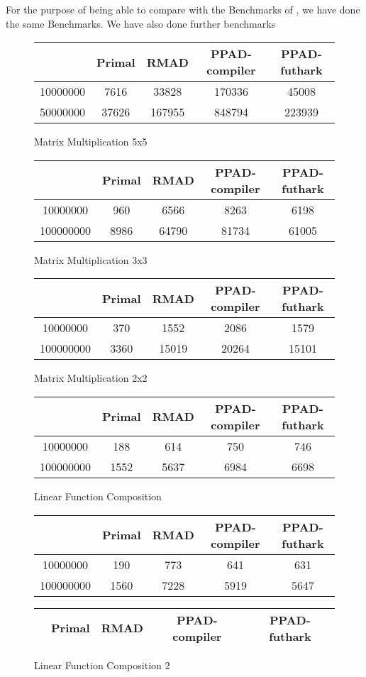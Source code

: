 \documentclass{article}
\begin{document}
For the purpose of being able to compare with the Benchmarks of
\cite{Futhark}, we have done the same Benchmarks. We have also done further
benchmarks
\begin{figure}
	\begin{tabular}{|c|c|c|c|c|}
		         & Primal & RMAD   & PPAD-compiler & PPAD-futhark \\
		\hline
		10000000 & 7616   & 33828  & 170336        & 45008        \\
		50000000 & 37626  & 167955 & 848794        & 223939
	\end{tabular}
	\caption{Matrix Multiplication 5x5}
	\begin{tabular}{|c|c|c|c|c|}
		          & Primal & RMAD  & PPAD-compiler & PPAD-futhark \\
		\hline

		10000000  & 960    & 6566  & 8263          & 6198         \\
		100000000 & 8986   & 64790 & 81734         & 61005
	\end{tabular}
	\caption{Matrix Multiplication 3x3}
	\begin{tabular}{|c|c|c|c|c|}
		          & Primal & RMAD  & PPAD-compiler & PPAD-futhark \\
		\hline

		10000000  & 370    & 1552  & 2086          & 1579         \\
		100000000 & 3360   & 15019 & 20264         & 15101
	\end{tabular}
	\caption{Matrix Multiplication 2x2}
	\begin{tabular}{|c|c|c|c|c|}
		          & Primal & RMAD & PPAD-compiler & PPAD-futhark \\
		\hline

		10000000  & 188    & 614  & 750           & 746          \\
		100000000 & 1552   & 5637 & 6984          & 6698
	\end{tabular}
	\caption{Linear Function Composition}
	\begin{tabular}{|c|c|c|c|c|}
		          & Primal & RMAD & PPAD-compiler & PPAD-futhark \\
		\hline

		10000000  & 190    & 773  & 641           & 631          \\
		100000000 & 1560   & 7228 & 5919          & 5647
	\end{tabular}
	\caption{Linear Function Composition 2}
	\begin{tabular}{|c|c|c|c|c|}
		          & Primal & RMAD  & PPAD-compiler & PPAD-futhark \\
		\hline


\end{tabular}
\end{figure}
\end{document}
